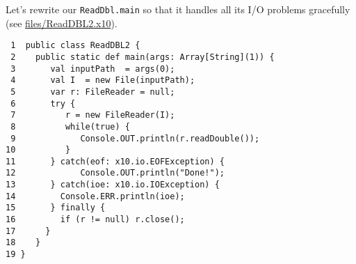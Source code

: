 Let's rewrite our {\tt ReadDbl.main} so that it handles all its I/O
problems gracefully (see
\href{http://dist.codehaus.org/x10/documentation/guide/src/files/ReadDBL2.x10}{files/ReadDBL2.x10}).
\begin{verbatim}
 1  public class ReadDBL2 {
 2    public static def main(args: Array[String](1)) {
 3       val inputPath  = args(0);
 4       val I  = new File(inputPath);
 5       var r: FileReader = null;
 6       try {
 7          r = new FileReader(I);
 8          while(true) {
 9             Console.OUT.println(r.readDouble());
10          }
11       } catch(eof: x10.io.EOFException) {
12             Console.OUT.println("Done!");
13       } catch(ioe: x10.io.IOException) {
14         Console.ERR.println(ioe);
15       } finally {
16         if (r != null) r.close();
17      }
18    } 
19 }
\end{verbatim}

